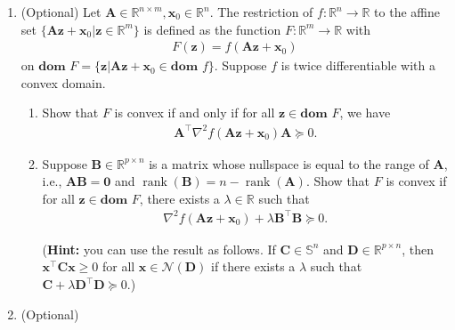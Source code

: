 \documentclass[11pt,letter,notitlepage]{article}
\begin{document}
\begin{exercise}
\begin{enumerate}
        
        \item (Optional) Let $\mathbf{A}\in \mathbb{R}^{n\times m},\mathbf{x}_0\in \mathbb{R}^n$. The restriction of $f:\mathbb{R}^n\rightarrow\mathbb{R}$ to the affine set $\{\mathbf{Az}+\mathbf{x}_0|\mathbf{z}\in\mathbb{R}^m\}$ is defined as the function $F:\mathbb{R}^m\rightarrow\mathbb{R}$ with
        \begin{align*}
            F(\mathbf{z})=f(\mathbf{Az}+\mathbf{x}_0)
        \end{align*}
        on $\textbf{dom }F=\{\mathbf{z}|\mathbf{Az}+\mathbf{x}_0\in\textbf{dom }f\}$. Suppose $f$ is twice differentiable with a convex domain.
        \begin{enumerate}
            \item Show that $F$ is convex if and only if for all $\mathbf{z}\in\textbf{dom }F$, we have
            \begin{align*}
                \mathbf{A}^\top\nabla^2f(\mathbf{Az}+\mathbf{x}_0)\mathbf{A}\succeq 0.
            \end{align*}
            \item Suppose $\mathbf{B}\in\mathbb{R}^{p\times n}$ is a matrix whose nullspace is equal to the range of $\mathbf{A}$, i.e., $\mathbf{AB}=\mathbf{0}$ and $\operatorname{rank} (\mathbf{B})=n-\operatorname{rank}(\mathbf{A})$. Show that $F$ is convex if for all $\mathbf{z}\in\textbf{dom }F$, there exists a $\lambda\in\mathbb{R}$ such that
            \begin{align*}
                \nabla^2f(\mathbf{Az}+\mathbf{x}_0)+\lambda\mathbf{B}^\top\mathbf{B}\succeq 0.
            \end{align*}
            
            (\textbf{Hint:} you can use the result as follows. If $\mathbf{C}\in\mathbb{S}^n$ and $\mathbf{D}\in\mathbb{R}^{p\times n}$, then $\mathbf{x}^\top\mathbf{C}\mathbf{x}\geq 0$ for all $\mathbf{x}\in\mathcal{N}(\mathbf{D})$ if there exists a $\lambda$ such that $\mathbf{C}+\lambda\mathbf{D}^\top\mathbf{D}\succeq 0.$)
        \end{enumerate}
        
        
        \item (Optional) \begin{enumerate}
            

\end{enumerate}
\end{enumerate}
\end{exercise}
\end{document}
